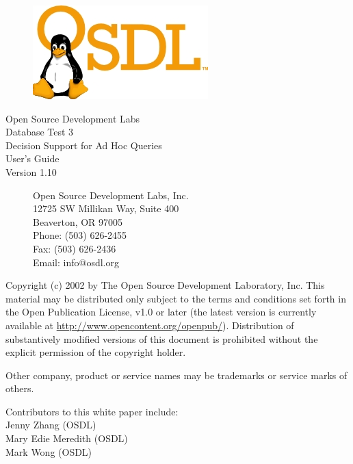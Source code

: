 \documentclass{article}
\begin{document}
\begin{titlepage}

  \begin{figure}[t]
    \centering
    \includegraphics[scale=1]{osdl-logo.png}
  \end{figure}

  \centering
  \huge
  Open Source Development Labs \\
  Database Test 3 \\
  Decision Support for Ad Hoc Queries \\
  \huge
  User's Guide \\
  \large
  Version 1.10

  \begin{figure}[b]
    \flushleft
    \normalsize
    Open Source Development Labs, Inc. \\
    12725 SW Millikan Way, Suite 400 \\
    Beaverton, OR 97005 \\
    Phone: (503) 626-2455 \\
    Fax: (503) 626-2436 \\
    Email: info@osdl.org
  \end{figure}

\end{titlepage}

\noindent
Copyright (c) 2002 by The Open Source Development Laboratory, Inc. This
material may be distributed only subject to the terms and conditions set forth
in the Open Publication License, v1.0 or later (the latest version is currently
available at \url{http://www.opencontent.org/openpub/}). Distribution of
substantively modified versions of this document is prohibited without the
explicit permission of the copyright holder.

\noindent
Other company, product or service names may be trademarks or service marks of
others.

\noindent
Contributors to this white paper include: \\
\indent Jenny Zhang (OSDL) \\
\indent Mary Edie Meredith (OSDL) \\
\indent Mark Wong (OSDL) \\
\end{document}
